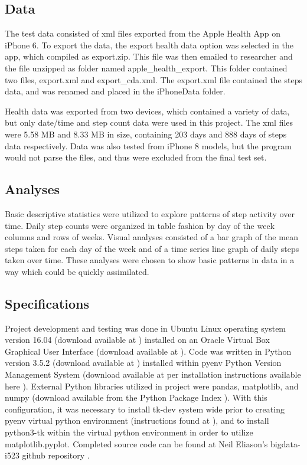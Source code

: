 \documentclass[sigconf]{acmart}
\begin{document}
\subsection{Data}

The test data consisted of xml files exported from the Apple Health App on iPhone 6. To export the data, the export health data option was selected in the app, which compiled as export.zip. This file was then emailed to researcher and the file unzipped as folder named apple\_health\_export. This folder contained two files, export.xml and export\_cda.xml. The export.xml file contained the steps data, and was renamed and placed in the iPhoneData folder. 

Health data was exported from two devices, which contained a variety of data, but only date/time and step count data were used in this project. The xml files were 5.58 MB and 8.33 MB in size, containing 203 days and 888 days of steps data respectively. Data was also tested from iPhone 8  models, but the program would not parse the files, and thus were excluded from the final test set.

\subsection{Analyses}

Basic descriptive statistics were utilized to explore patterns of step activity over time. Daily step counts were organized in table fashion by day of the week columns and rows of weeks. Visual analyses consisted of a bar graph of the mean steps taken for each day of the week and of a time series line graph of daily steps taken over time. These analyses were chosen to show basic patterns in data in a way which could be quickly assimilated. 

\subsection{Specifications}

Project development and testing was done in Ubuntu Linux operating system version 16.04 (download available at \cite{ubuntu}) installed on an Oracle Virtual Box Graphical User Interface (download available at \cite{virtualbox}). Code was written in Python version 3.5.2 (download available at \cite{python3.5.2}) installed within pyenv Python Version Management System (download available at \cite{pyenv} per installation instructions available here \cite{cloudmeshpyenv}). External Python libraries utilized in project were pandas, matplotlib, and numpy (download available from the Python Package Index \cite{pypi}). With this configuration, it was necessary to install tk-dev system wide prior to creating pyenv virtual python environment (instructions found at \cite{tk-dev}), and to install python3-tk within the virtual python environment in order to utilize matplotlib.pyplot. Completed source code can be found at Neil Eliason's bigdata-i523 github repository \cite{sourcecode}. 
\end{document}
